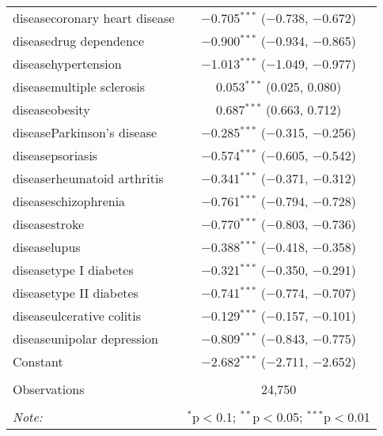 \begin{table}[!htbp]
\begin{tabular}{@{\extracolsep{5pt}}lc}
  diseasecoronary heart disease & $-$0.705$^{***}$ ($-$0.738, $-$0.672) \\ 
  diseasedrug dependence & $-$0.900$^{***}$ ($-$0.934, $-$0.865) \\ 
  diseasehypertension & $-$1.013$^{***}$ ($-$1.049, $-$0.977) \\ 
  diseasemultiple sclerosis & 0.053$^{***}$ (0.025, 0.080) \\ 
  diseaseobesity & 0.687$^{***}$ (0.663, 0.712) \\ 
  diseaseParkinson's disease & $-$0.285$^{***}$ ($-$0.315, $-$0.256) \\ 
  diseasepsoriasis & $-$0.574$^{***}$ ($-$0.605, $-$0.542) \\ 
  diseaserheumatoid arthritis & $-$0.341$^{***}$ ($-$0.371, $-$0.312) \\ 
  diseaseschizophrenia & $-$0.761$^{***}$ ($-$0.794, $-$0.728) \\ 
  diseasestroke & $-$0.770$^{***}$ ($-$0.803, $-$0.736) \\ 
  diseaselupus & $-$0.388$^{***}$ ($-$0.418, $-$0.358) \\ 
  diseasetype I diabetes & $-$0.321$^{***}$ ($-$0.350, $-$0.291) \\ 
  diseasetype II diabetes & $-$0.741$^{***}$ ($-$0.774, $-$0.707) \\ 
  diseaseulcerative colitis & $-$0.129$^{***}$ ($-$0.157, $-$0.101) \\ 
  diseaseunipolar depression & $-$0.809$^{***}$ ($-$0.843, $-$0.775) \\ 
  Constant & $-$2.682$^{***}$ ($-$2.711, $-$2.652) \\ 
 \hline \\[-1.8ex] 
Observations & 24,750 \\ 
\hline 
\hline \\[-1.8ex] 
\textit{Note:}  & \multicolumn{1}{r}{$^{*}$p$<$0.1; $^{**}$p$<$0.05; $^{***}$p$<$0.01} \\ 
\end{tabular} 
\end{table} 
